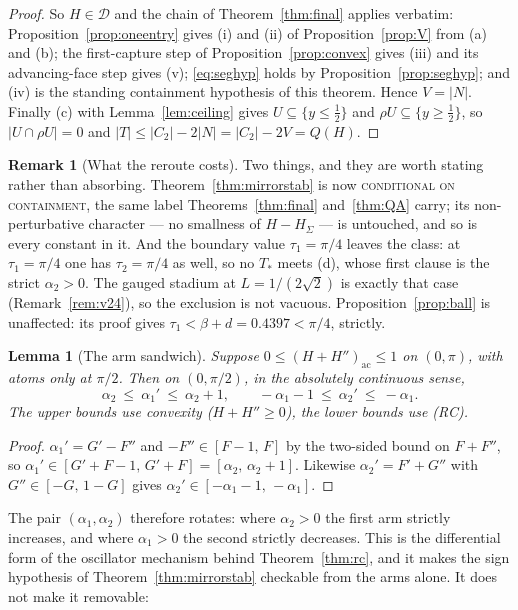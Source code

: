 \documentclass[11pt]{article}
\newtheorem{lemma}[theorem]{Lemma}
\theoremstyle{definition}
\newtheorem{remark}[theorem]{Remark}
\newcommand{\Sig}{\Sigma}
\begin{document}
\begin{proof}
So $H\in\mathcal D$ and the chain of Theorem~\ref{thm:final} applies verbatim:
Proposition~\ref{prop:oneentry} gives (i) and (ii) of Proposition~\ref{prop:V} from (a) and
(b); the first-capture step of Proposition~\ref{prop:convex} gives (iii) and its
advancing-face step gives (v); \eqref{eq:seghyp} holds by Proposition~\ref{prop:seghyp}; and
(iv) is the standing containment hypothesis of this theorem. Hence $V=|N|$. Finally (c) with
Lemma~\ref{lem:ceiling} gives $U\subseteq\{y\le\tfrac12\}$ and $\rho U\subseteq\{y\ge\tfrac12\}$,
so $|U\cap\rho U|=0$ and $|T|\le|C_2|-2|N|=|C_2|-2V=Q(H)$.
\end{proof}

\begin{remark}[What the reroute costs]\label{rem:v35}
Two things, and they are worth stating rather than absorbing. Theorem~\ref{thm:mirrorstab} is
now \textsc{conditional on containment}, the same label Theorems~\ref{thm:final}
and~\ref{thm:QA} carry; its non-perturbative character --- no smallness of $H-H_\Sig$ --- is
untouched, and so is every constant in it. And the boundary value $\tau_1=\pi/4$ leaves the
class: at $\tau_1=\pi/4$ one has $\tau_2=\pi/4$ as well, so no $T_\ast$ meets (d), whose
first clause is the strict $\alpha_2>0$. The gauged stadium at $L=1/(2\sqrt2)$ is exactly
that case (Remark~\ref{rem:v24}), so the exclusion is not vacuous. Proposition~\ref{prop:ball}
is unaffected: its proof gives $\tau_1<\beta+d=0.4397<\pi/4$, strictly.
\end{remark}

\begin{lemma}[The arm sandwich]\label{lem:sandwich}
Suppose $0\le(H+H'')_{\mathrm{ac}}\le1$ on $(0,\pi)$, with atoms only at $\pi/2$. Then on
$(0,\pi/2)$, in the absolutely continuous sense,
\[
  \alpha_2\ \le\ \alpha_1'\ \le\ \alpha_2+1,
  \qquad
  -\alpha_1-1\ \le\ \alpha_2'\ \le\ -\alpha_1 .
\]
The upper bounds use convexity ($H+H''\ge0$), the lower bounds use (RC).
\end{lemma}

\begin{proof}
$\alpha_1'=G'-F''$ and $-F''\in[F-1,\,F]$ by the two-sided bound on $F+F''$, so
$\alpha_1'\in[G'+F-1,\,G'+F]=[\alpha_2,\,\alpha_2+1]$. Likewise $\alpha_2'=F'+G''$ with
$G''\in[-G,\,1-G]$ gives $\alpha_2'\in[-\alpha_1-1,\,-\alpha_1]$.
\end{proof}

The pair $(\alpha_1,\alpha_2)$ therefore rotates: where $\alpha_2>0$ the first arm
strictly increases, and where $\alpha_1>0$ the second strictly decreases. This is the
differential form of the oscillator mechanism behind Theorem~\ref{thm:rc}, and it makes
the sign hypothesis of Theorem~\ref{thm:mirrorstab} checkable from the arms alone. It
does not make it removable:
\end{document}
